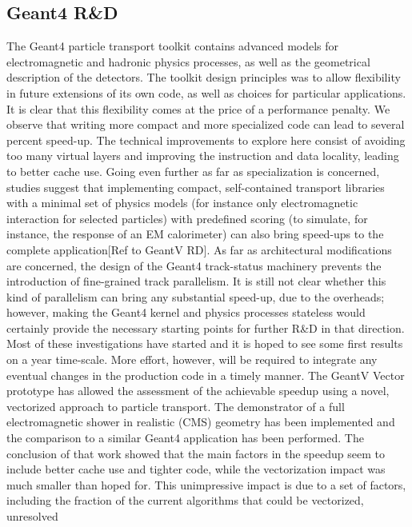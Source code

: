 \documentclass[11pt,a4paper]{article}
\begin{document}
\hypertarget{geant4-rd}{%
\subsection{Geant4 R\&D}\label{geant4-rd}}

The Geant4 particle transport toolkit contains advanced models for
electromagnetic and hadronic physics processes, as well as the
geometrical description of the detectors. The toolkit design principles
was to allow flexibility in future extensions of its own code, as well
as choices for particular applications. It is clear that this
flexibility comes at the price of a performance penalty. We observe that
writing more compact and more specialized code can lead to several
percent speed-up. The technical improvements to explore here consist of
avoiding too many virtual layers and improving the instruction and data
locality, leading to better cache use. Going even further as far as
specialization is concerned, studies suggest that implementing compact,
self-contained transport libraries with a minimal set of physics models
(for instance only electromagnetic interaction for selected particles)
with predefined scoring (to simulate, for instance, the response of an
EM calorimeter) can also bring speed-ups to the complete
application{[}Ref to GeantV RD{]}. As far as architectural modifications
are concerned, the design of the Geant4 track-status machinery prevents
the introduction of fine-grained track parallelism. It is still not
clear whether this kind of parallelism can bring any substantial
speed-up, due to the overheads; however, making the Geant4 kernel and
physics processes stateless would certainly provide the necessary
starting points for further R\&D in that direction. Most of these
investigations have started and it is hoped to see some first results on
a year time-scale. More effort, however, will be required to integrate
any eventual changes in the production code in a timely manner. The
GeantV Vector prototype has allowed the assessment of the achievable
speedup using a novel, vectorized approach to particle transport. The
demonstrator of a full electromagnetic shower in realistic (CMS)
geometry has been implemented and the comparison to a similar Geant4
application has been performed. The conclusion of that work showed that
the main factors in the speedup seem to include better cache use and
tighter code, while the vectorization impact was much smaller than hoped
for. This unimpressive impact is due to a set of factors, including the
fraction of the current algorithms that could be vectorized, unresolved
\end{document}
